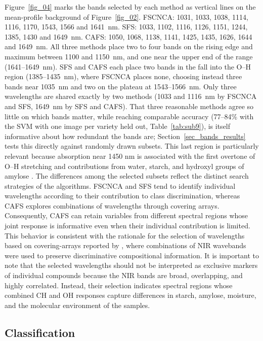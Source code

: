 \documentclass[final,5p,times,twocolumn]{elsarticle}
\newcommand{\added}[1]{{\color{blue}#1}}
\begin{document}
\added{Figure~\ref{fig_04} marks the bands selected by each method as vertical lines on the mean-profile background of Figure~\ref{fig_02}. FSCNCA: 1031, 1033, 1038, 1114, 1116, 1170, 1543, 1566 and 1641~nm. SFS: 1033, 1102, 1116, 1126, 1151, 1244, 1385, 1430 and 1649~nm. CAFS: 1050, 1068, 1138, 1141, 1425, 1435, 1626, 1644 and 1649~nm. All three methods place two to four bands on the rising edge and maximum between 1100 and 1150~nm, and one near the upper end of the range (1641--1649~nm). SFS and CAFS each place two bands in the fall into the O--H region (1385--1435~nm), where FSCNCA places none, choosing instead three bands near 1035~nm and two on the plateau at 1543--1566~nm. Only three wavelengths are shared exactly by two methods (1033 and 1116~nm by FSCNCA and SFS, 1649~nm by SFS and CAFS). That three reasonable methods agree so little on which bands matter, while reaching comparable accuracy (77--84\% with the SVM with one image per variety held out, Table~\ref{tab:sub9}), is itself informative about how redundant the bands are; Section~\ref{sec_bands_results} tests this directly against randomly drawn subsets.}
This \added{last} region is particularly relevant because absorption near 1450 nm is associated with the first overtone of O–H stretching and contributions from water, starch, and hydroxyl groups of amylose \cite{Onmarkhong2022}.
The differences among the selected subsets reflect the distinct search strategies of the algorithms. 
FSCNCA and SFS tend to identify individual wavelengths according to their contribution to class discrimination, whereas CAFS explores combinations of wavelengths through covering arrays. 
Consequently, CAFS can retain variables from different spectral regions whose joint response is informative even when their individual contribution is limited. 
This behavior is consistent with the rationale for the selection of wavelengths based on covering-arrays reported by \citet{Castro2022cafs}, where combinations of NIR wavebands were used to preserve discriminative compositional information. 
It is important to note that the selected wavelengths should not be interpreted as exclusive markers of individual compounds because the NIR bands are broad, overlapping, and highly correlated. 
Instead, their selection indicates spectral regions whose combined CH and OH responses capture differences in starch, amylose, moisture, and the molecular environment of the samples.


\subsection{Classification}\label{sec_classification}
\end{document}

